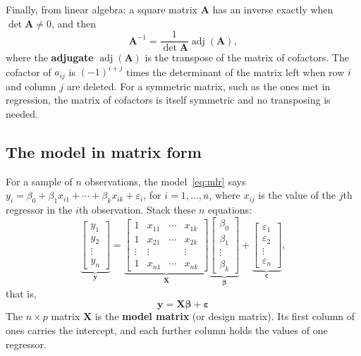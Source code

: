 \documentclass[11pt,a4paper]{article}
\numberwithin{equation}{section}
\theoremstyle{definition}
\begin{document}
Finally, from linear algebra: a square matrix $\mathbf{A}$ has an inverse exactly when
$\det \mathbf{A} \neq 0$, and then
\[
\mathbf{A}^{-1} = \frac{1}{\det \mathbf{A}} \operatorname{adj}(\mathbf{A}),
\]
where the \textbf{adjugate} $\operatorname{adj}(\mathbf{A})$ is the transpose of the matrix
of cofactors. The cofactor of $a_{ij}$ is $(-1)^{i+j}$ times the determinant of the matrix
left when row $i$ and column $j$ are deleted. For a symmetric matrix, such as the ones met
in regression, the matrix of cofactors is itself symmetric and no transposing is needed.

\subsection{The model in matrix form}
For a sample of $n$ observations, the model~\eqref{eq:mlr} says
$y_i = \beta_0 + \beta_1 x_{i1} + \cdots + \beta_k x_{ik} + \varepsilon_i$, for
$i = 1, \dots, n$, where $x_{ij}$ is the value of the $j$th regressor in the $i$th
observation. Stack these $n$ equations:
\[
\underbrace{\begin{bmatrix} y_1 \\ y_2 \\ \vdots \\ y_n \end{bmatrix}}_{\mathbf{y}}
=
\underbrace{\begin{bmatrix}
1 & x_{11} & \cdots & x_{1k} \\
1 & x_{21} & \cdots & x_{2k} \\
\vdots & \vdots & & \vdots \\
1 & x_{n1} & \cdots & x_{nk}
\end{bmatrix}}_{\mathbf{X}}
\underbrace{\begin{bmatrix} \beta_0 \\ \beta_1 \\ \vdots \\ \beta_k \end{bmatrix}}_{\boldsymbol\beta}
+
\underbrace{\begin{bmatrix} \varepsilon_1 \\ \varepsilon_2 \\ \vdots \\ \varepsilon_n \end{bmatrix}}_{\boldsymbol\varepsilon},
\]
that is,
\[
\boxed{\;\mathbf{y} = \mathbf{X}\boldsymbol\beta + \boldsymbol\varepsilon\;}
\]
The $n \times p$ matrix $\mathbf{X}$ is the \textbf{model matrix} (or design matrix). Its
first column of ones carries the intercept, and each further column holds the values of one
regressor.
\end{document}
